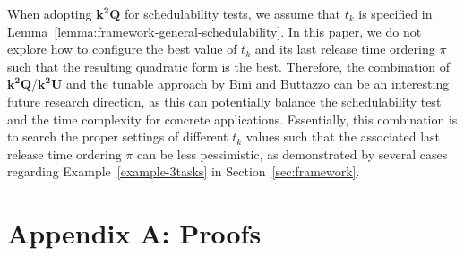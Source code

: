\documentclass[10pt,conference]{IEEEtran}
\newcommand{\frameworkkq}[1]{$\mathbf{k^2Q}$}
\newcommand{\frameworkku}[1]{$\mathbf{k^2U}$}
\begin{document}
When adopting \frameworkkq{} for schedulability tests, we assume that
$t_k$ is specified in
Lemma~\ref{lemma:framework-general-schedulability}. In this paper, we
do not explore how to configure the best value of $t_k$ and its last
release time ordering $\pi$ such that the resulting quadratic form is
the best. Therefore, the combination of \frameworkkq{}/\frameworkku{}
and the tunable approach by Bini and Buttazzo
\cite{DBLP:journals/tc/BiniB04} can be an interesting future research
direction, as this can potentially balance the schedulability test and
the time complexity for concrete applications. Essentially, this
combination is to search the proper settings of different $t_k$ values
such that the associated last release time ordering $\pi$ can be 
less pessimistic, as demonstrated by several cases regarding Example~\ref{example-3tasks} in Section~\ref{sec:framework}.

 \begin{spacing}{0.9}
 \end{spacing}

\footnotesize
\vspace{-0.1in}
\begin{spacing}{0.98}
\def\IEEEbibitemsep{-1pt}


\end{spacing}
\normalsize

\section*{Appendix A: Proofs}
\end{document}
